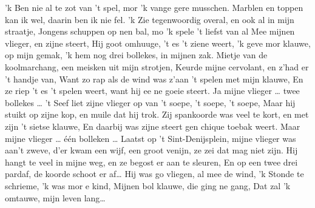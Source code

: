 \beginverse*
'k Ben nie al te zot van 't spel, mor 'k vange gere musschen. 
Marblen en toppen kan ik wel, daarin ben ik nie fel.
'k Zie tegenwoordig overal, en ook al in mijn straatje,
Jongens schuppen op nen bal, mo 'k spele 't liefst van al
\endverse
\beginchorus
Mee mijnen vlieger, en zijne steert,
Hij goot omhuuge, 't es 't ziene weert,
'k geve mor klauwe, op mijn gemak,
'k hem nog drei bollekes, in mijnen zak. 
\endchorus
\beginverse*
Mietje van de koolmarchang, een meisken uit mijn strotjen,
Keurde mijne cervolant, en z’had er 't handje van,
Want zo rap als de wind was z’aan 't spelen met mijn klauwe,
En ze riep 't es 't spelen weert, want hij ee ne goeie steert. 
Ja mijne vlieger … twee bollekes … 
\endverse
\beginverse*
't Seef liet zijne vlieger op van 't soepe, 't soepe, 't soepe,
Maar hij stuikt op zijne kop, en muile dat hij trok. 
Zij spankoorde was veel te kort, en met zijn 't sietse klauwe, 
En daarbij was zijne steert gen chique toebak weert.
Maar mijne vlieger … één bolleken …
\endverse
\beginverse*
Laatst op 't Sint-Denijsplein, mijne vlieger was aan’t zweve,
d’er kwam een wijf, een groot venijn, ze zei dat mag niet zijn. 
Hij hangt te veel in mijne weg, en ze begost er aan te sleuren,
En op een twee drei pardaf, de koorde schoot er af…
\endverse
\beginchorus
Hij was go vliegen, al mee de wind,
'k Stonde te schrieme, 'k was mor e kind,
Mijnen bol klauwe, die ging ne gang,
Dat zal 'k omtauwe, mijn leven lang…  
\endchorus
\endsong 